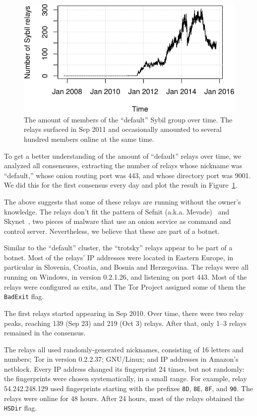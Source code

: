 \begin{figure}[t]
	\centering
	\includegraphics[width=\linewidth]{diagrams/default-over-time}
	\caption{The amount of members of the ``default'' Sybil group over time.
		The relays surfaced in Sep 2011 and occasionally amounted to several
		hundred members online at the same time.}
	\label{fig:default-over-time}
\end{figure}

To get a better understanding of the amount of ``default'' relays over time, we
analyzed all consensuses, extracting the number of relays whose nickname was
``default,'' whose onion routing port was 443, and whose directory port was
9001.  We did this for the first consensus every day and plot the result in
Figure~\ref{fig:default-over-time}.

The above suggests that some of these relays are running without the owner's
knowledge.  The relays don't fit the pattern of Sefnit (a.k.a.
Mevade)~\cite{sefnit} and Skynet~\cite{skynet}, two pieces of malware that use
an onion service as command and control server.  Nevertheless, we believe that
these are part of a botnet.

Similar to the ``default'' cluster, the ``trotsky'' relays appear to be part of
a botnet.  Most of the relays' IP addresses were located in Eastern Europe, in
particular in Slovenia, Croatia, and Bosnia and Herzegovina.  The relays were
all running on Windows, in version 0.2.1.26, and listening on port 443.  Most of
the relays were configured as exits, and The Tor Project assigned some of them
the \texttt{BadExit} flag.

The first relays started appearing in Sep 2010.  Over time, there were two relay
peaks, reaching 139 (Sep 23) and 219 (Oct 3) relays.  After that, only 1--3
relays remained in the consensus.

The relays all used randomly-generated nicknames, consisting of 16 letters and
numbers; Tor in version 0.2.2.37; GNU/Linux; and IP addresses in Amazon's
netblock.  Every IP address changed its fingerprint 24 times, but not randomly:
the fingerprints were chosen systematically, in a small range.  For example,
relay 54.242.248.129 used fingerprints starting with the prefixes \texttt{8D},
\texttt{8E}, \texttt{8F}, and \texttt{90}.  The relays were online for 48 hours.
After 24 hours, most of the relays obtained the \texttt{HSDir} flag.

